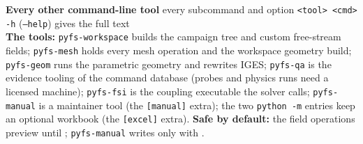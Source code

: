 \newpage
\fontsize{5.9}{6.7}\selectfont
\begin{tcolorbox}[colback=tool!8,colframe=tool,boxrule=0.4pt,left=2pt,right=2pt,top=1pt,bottom=1pt]
{\large\bfseries\color{tool} Every other command-line tool} \hfill {\small \pkgname{} \textbf{\pkgversion} \quad every subcommand and option \quad \texttt{<tool> <cmd> -h} (\texttt{--help}) gives the full text}\\[1pt]
\textbf{The tools:} \texttt{pyfs-workspace} builds the campaign tree and custom free-stream fields; \texttt{pyfs-mesh} holds every mesh operation and the workspace geometry build; \texttt{pyfs-geom} runs the parametric geometry and rewrites IGES; \texttt{pyfs-qa} is the evidence tooling of the command database (probes and physics runs need a licensed machine); \texttt{pyfs-fsi} is the coupling executable the solver calls; \texttt{pyfs-manual} is a maintainer tool (the \texttt{[manual]} extra); the two \texttt{python -m} entries keep an optional workbook (the \texttt{[excel]} extra). \textbf{Safe by default:} the field operations preview until ; \texttt{pyfs-manual} writes only with .
\end{tcolorbox}
\vspace{-2pt}
